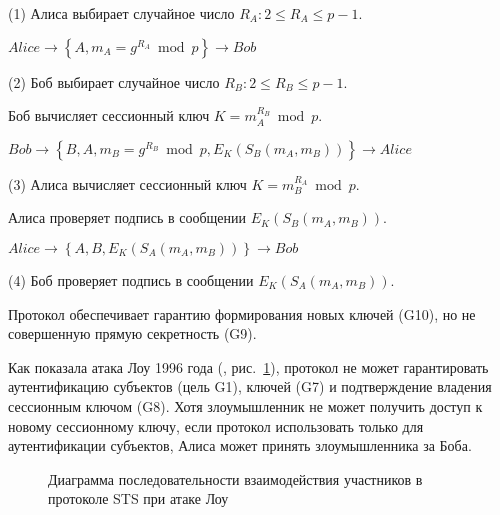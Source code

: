 \begin{protocol}
    \item[(1)] Алиса выбирает случайное число $R_A: 2 \leq R_A \leq p-1$.
    \item[{}] $Alice \to \left\{ A, m_A = g^{R_A} \bmod p \right\} \to Bob$

    \item[(2)] Боб выбирает случайное число $R_B: 2 \leq R_B \leq p-1$.
    \item[{}] Боб вычисляет сессионный ключ $K = m_A^{R_B} \bmod p$.
    \item[{}] $Bob \to \left\{ B, A, m_B = g^{R_B} \bmod p, E_K( S_B ( m_A, m_B )) \right\} \to Alice$

    \item[(3)] Алиса вычисляет сессионный ключ $K = m_B^{R_A} \bmod p$.
    \item[{}] Алиса проверяет подпись в сообщении $E_K( S_B ( m_A, m_B ))$.
    \item[{}] $Alice \to \left\{ A, B, E_K( S_A ( m_A, m_B ) ) \right\} \to Bob$

    \item[(4)] Боб проверяет подпись в сообщении $E_K( S_A ( m_A, m_B ))$.
\end{protocol}

Протокол обеспечивает гарантию формирования новых ключей (G10), но не совершенную прямую секретность (G9).

Как показала атака Лоу 1996 года (\cite{Lowe:1996}, рис.~\ref{fig:key_distribution-sts-attack}), протокол не может гарантировать аутентификацию субъектов (цель G1), ключей (G7) и подтверждение владения сессионным ключом (G8). Хотя злоумышленник не может получить доступ к новому сессионному ключу, если протокол использовать только для аутентификации субъектов, Алиса может принять злоумышленника за Боба.

\begin{figure}[thb]
	\centering
	\begin{sequencediagram}

	\end{sequencediagram}
	\caption{Диаграмма последовательности взаимодействия участников в протоколе STS при атаке Лоу\label{fig:key_distribution-sts-attack}}
\end{figure}

